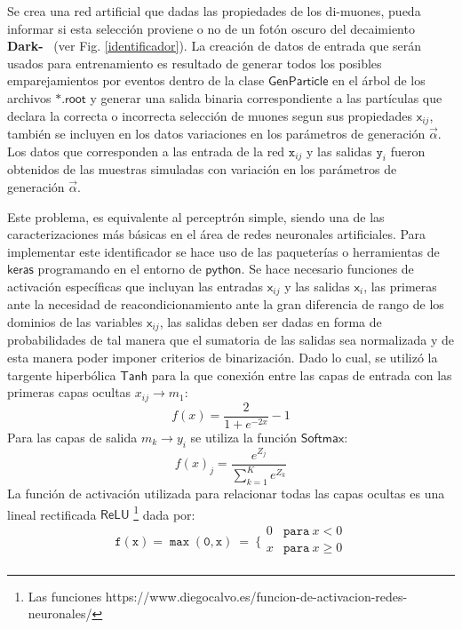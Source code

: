 Se crea una red artificial que dadas las propiedades de los di-muones, pueda informar si esta selección proviene o no de un fotón oscuro del decaimiento \textbf{Dark-}\SUSY%
~(ver Fig. \ref{identificador}). La creación de datos de entrada que serán usados para entrenamiento es resultado de generar todos los posibles emparejamientos por eventos dentro de la clase $\textsf{GenParticle}$ en el árbol de los archivos $\textsf{*.root}$ y generar una salida binaria correspondiente a las partículas que declara la correcta o incorrecta selección de muones segun sus propiedades $\textsf{x}_{ij}$, también se incluyen en los datos variaciones en los parámetros de generación $\vec{\alpha}$. Los datos que corresponden a las entrada de la red $\mathtt{x}_{ij}$ y las salidas $\mathtt{y}_i$ fueron obtenidos de las muestras simuladas con variación en los parámetros de generación $\vec{\alpha}$. 


Este problema, es equivalente al perceptrón simple, siendo una de las caracterizaciones más básicas en el área de redes neuronales artificiales. Para implementar este identificador se hace uso de las paqueterías o herramientas de $\textsf{keras}$ programando en el entorno de $\textsf{python}$. Se hace necesario funciones de activación específicas que incluyan las entradas $\textsf{x}_{ij}$ y las salidas $\textsf{x}_i$, las primeras ante la necesidad de reacondicionamiento ante la gran diferencia de rango de los dominios de las variables $\textsf{x}_{ij}$, las salidas deben ser dadas en forma de probabilidades de tal manera que el sumatoria de las salidas sea normalizada y de esta manera poder imponer criterios de binarización. Dado lo cual, se utilizó la targente hiperbólica $\textsf{Tanh}$ para la que conexión entre las capas de entrada con las primeras capas ocultas $x_{ij} \longrightarrow m_1$:
\begin{equation}
f(x)=\dfrac{2}{1+e^{-2x}}-1
\end{equation}
Para las capas de salida $m_k \longrightarrow y_i$ se utiliza la función $\textsf{Softmax}$:
\begin{equation}
f(x)_j = \dfrac{e^{Z_j}}{\sum_{k=1}^{K}e^{Z_k}}
\end{equation}
La función de activación utilizada para relacionar todas las capas ocultas es una lineal rectificada $\textsf{ReLU}$ \footnote{Las funciones https://www.diegocalvo.es/funcion-de-activacion-redes-neuronales/} dada por:
\begin{equation}\label{relu}
\mathtt{f(x)=\max (0,x)} ~ = ~ \Bigg\{\begin{matrix}
0 & \mathtt{para }~ x<0\\
x & \mathtt{para }~ x\geq 0\\
\end{matrix} 
\end{equation}

